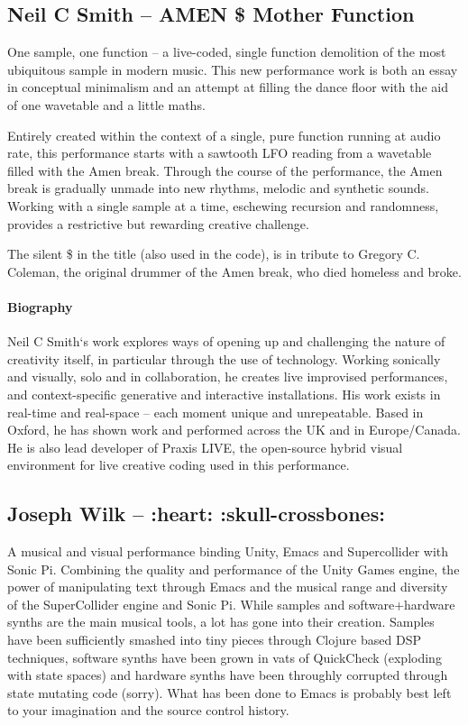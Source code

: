 \documentclass[sigplan,10pt]{acmart}\settopmatter{}
\begin{document}
\subsection{Neil C Smith -- AMEN \${} Mother Function}

One sample, one function -- a live-coded, single function demolition of
the most ubiquitous sample in modern music. This new performance work
is both an essay in conceptual minimalism and an attempt at filling
the dance floor with the aid of one wavetable and a little maths.

Entirely created within the context of a single, pure function running
at audio rate, this performance starts with a sawtooth LFO reading
from a wavetable filled with the Amen break. Through the course of the
performance, the Amen break is gradually unmade into new rhythms,
melodic and synthetic sounds. Working with a single sample at a time,
eschewing recursion and randomness, provides a restrictive but
rewarding creative challenge.

The silent \${} in the title (also used in the code), is in tribute to
Gregory C. Coleman, the original drummer of the Amen break, who died
homeless and broke.

\paragraph{Biography}

Neil C Smith‘s work explores ways of opening up and challenging the
nature of creativity itself, in particular through the use of
technology. Working sonically and visually, solo and in collaboration,
he creates live improvised performances, and context-specific
generative and interactive installations. His work exists in real-time
and real-space – each moment unique and unrepeatable. Based in Oxford,
he has shown work and performed across the UK and in Europe/Canada. He
is also lead developer of Praxis LIVE, the open-source hybrid visual
environment for live creative coding used in this
performance.


\subsection{Joseph Wilk -- :heart: :skull-crossbones:}

A musical and visual performance binding Unity, Emacs and
Supercollider with Sonic Pi. Combining the quality and performance of
the Unity Games engine, the power of manipulating text through Emacs
and the musical range and diversity of the SuperCollider engine and
Sonic Pi. While samples and software+hardware synths are the main
musical tools, a lot has gone into their creation. Samples have been
sufficiently smashed into tiny pieces through Clojure based DSP
techniques, software synths have been grown in vats of QuickCheck
(exploding with state spaces) and hardware synths have been throughly
corrupted through state mutating code (sorry). What has been done to
Emacs is probably best left to your imagination and the source control
history.
\end{document}
